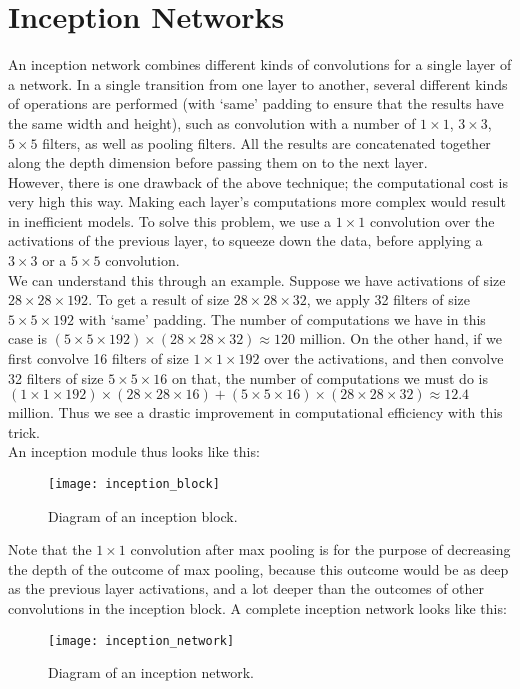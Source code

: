 \documentclass[a4paper, 12pt]{report}
\begin{document}
\section{Inception Networks}
An inception network combines different kinds of convolutions for a single layer of a network. In a single transition from one layer to another, several different kinds of operations are performed (with `same' padding to ensure that the results have the same width and height), such as convolution with a number of $1\times 1$, $3\times 3$, $5\times 5$ filters, as well as pooling filters. All the results are concatenated together along the depth dimension before passing them on to the next layer.\\
\break
However, there is one drawback of the above technique; the computational cost is very high this way. Making each layer's computations more complex would result in inefficient models. To solve this problem, we use a $1\times 1$ convolution over the activations of the previous layer, to squeeze down the data, before applying a $3\times 3$ or a $5\times 5$ convolution.\\
\break
We can understand this through an example. Suppose we have activations of size $28\times 28\times 192$. To get a result of size $28\times 28\times 32$, we apply 32 filters of size $5\times 5\times 192$ with `same' padding. The number of computations we have in this case is $(5\times 5\times 192)\times (28\times 28\times 32)\approx 120$ million. On the other hand, if we first convolve 16 filters of size $1\times 1\times 192$ over the activations, and then convolve 32 filters of size $5\times 5\times 16$ on that, the number of computations we must do is $(1\times 1\times 192)\times(28\times 28\times 16)+(5\times 5\times 16)\times(28\times 28\times 32)\approx 12.4$ million. Thus we see a drastic improvement in computational efficiency with this trick.\\
\break
An inception module thus looks like this:
\begin{figure}[H]
\centering
\texttt{[image: inception\_block]}
\caption{Diagram of an inception block.}
\end{figure}
Note that the $1\times 1$ convolution after max pooling is for the purpose of decreasing the depth of the outcome of max pooling, because this outcome would be as deep as the previous layer activations, and a lot deeper than the outcomes of other convolutions in the inception block. A complete inception network looks like this:
\begin{figure}[H]
\centering
\texttt{[image: inception\_network]}
\caption{Diagram of an inception network.}
\end{figure}
\end{document}
